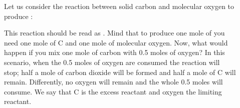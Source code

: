 \documentclass[main.tex]{subfiles}
\begin{document}
\begin{description}
\item[] 
Let us consider the reaction between solid carbon and molecular oxygen to produce :
\begin{center} \end{center}
This reaction should be read as . Mind that to produce one mole of  you need one mole of C and one mole of molecular oxygen. Now, what would happen if you mix one mole of carbon with 0.5 moles of oxygen? In this scenario, when the 0.5 moles of oxygen are consumed the reaction will stop; half a mole of carbon dioxide will be formed and half a mole of C will remain. Differently, no oxygen will remain and the whole 0.5 moles will consume. We say that C is the excess reactant and oxygen the limiting reactant. 


\end{description}
\end{document}
